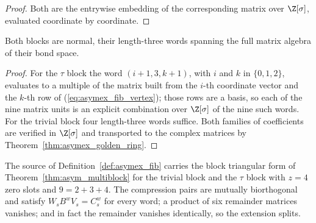 \begin{proof}
    \leanok
    Both are the entrywise embedding of the corresponding matrix over
    $\Z[\sigma]$, evaluated coordinate by coordinate.
\end{proof}

\begin{theorem}
    \label{thm:asymex_fib_normal}
    \leanok
    Both blocks are normal, their length-three words spanning the full
    matrix algebra of their bond space.
\end{theorem}

\begin{proof}
    \leanok
    For the $\tau$ block the word $(i+1,3,k+1)$, with $i$ and $k$ in
    $\{0,1,2\}$, evaluates to a multiple of the matrix built from the $i$-th
    coordinate vector and the $k$-th row of (\ref{eq:asymex_fib_vertex});
    those rows are a basis, so each of the nine matrix units is an explicit
    combination over $\Z[\sigma]$ of the nine such words. For the trivial block four length-three words suffice. Both
    families of coefficients are verified in $\Z[\sigma]$ and transported to
    the complex matrices by Theorem~\ref{thm:asymex_golden_ring}.
\end{proof}

\begin{theorem}
    \label{thm:asymex_fib_compression}
    \leanok
    The source of Definition~\ref{def:asymex_fib} carries the block
    triangular form of Theorem~\ref{thm:asym_multiblock} for the trivial
    block and the $\tau$ block with $z=4$ zero slots and $9=2+3+4$. The
    compression pairs are mutually biorthogonal and satisfy
    $W_sB^wV_s=C_s^w$ for every word; a product of six remainder matrices
    vanishes; and in fact the remainder vanishes identically, so the
    extension splits.
\end{theorem}

